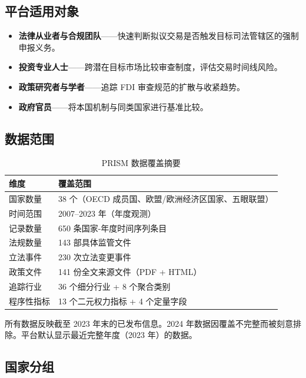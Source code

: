 \documentclass[12pt,a4paper]{article}
\begin{document}
\subsection{平台适用对象}

\begin{itemize}
  \item \textbf{法律从业者与合规团队}——快速判断拟议交易是否触发目标司法管辖区的强制申报义务。
  \item \textbf{投资专业人士}——跨潜在目标市场比较审查制度，评估交易时间线风险。
  \item \textbf{政策研究者与学者}——追踪 FDI 审查规范的扩散与收紧趋势。
  \item \textbf{政府官员}——将本国机制与同类国家进行基准比较。
\end{itemize}

\subsection{数据范围}

\begin{table}[h]
\centering
\begin{tabularx}{\linewidth}{lX}
\toprule
\textbf{维度} & \textbf{覆盖范围} \\
\midrule
国家数量 & 38 个（OECD 成员国、欧盟/欧洲经济区国家、五眼联盟） \\
时间范围 & 2007--2023 年（年度观测） \\
记录数量 & 650 条国家-年度时间序列条目 \\
法规数量 & 143 部具体监管文件 \\
立法事件 & 230 次立法变更事件 \\
政策文件 & 141 份全文来源文件（PDF + HTML） \\
追踪行业 & 36 个细分行业 + 8 个聚合类别 \\
程序性指标 & 13 个二元权力指标 + 4 个定量字段 \\
\bottomrule
\end{tabularx}
\caption{PRISM 数据覆盖摘要}
\end{table}

\begin{tipbox}[数据时效性]
所有数据反映截至 2023 年末的已发布信息。2024 年数据因覆盖不完整而被刻意排除。平台默认显示最近完整年度（2023 年）的数据。
\end{tipbox}

\subsection{国家分组}
\end{document}
